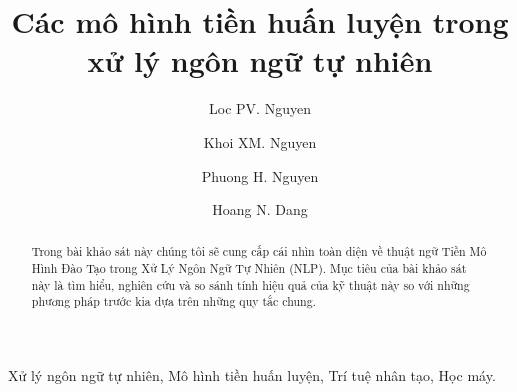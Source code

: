 \begin{frontmatter}
\title{Các mô hình tiền huấn luyện trong xử lý ngôn ngữ tự nhiên}
\author{Loc PV. Nguyen}
\author{Khoi XM. Nguyen}
\author{Phuong H. Nguyen}
\author{Hoang N. Dang}
\address{Faculty of Information Technology, FPT University Global Education, Ho Chi Minh city, Vietnam}

\begin{abstract}
Trong bài khảo sát này chúng tôi sẽ cung cấp cái nhìn toàn diện về thuật ngữ Tiền Mô Hình Đào Tạo trong Xử Lý Ngôn Ngữ Tự Nhiên (NLP). Mục tiêu của bài khảo sát này là tìm hiểu, nghiên cứu và so sánh tính hiệu quả của kỹ thuật này so với những phương pháp trước kia dựa trên những quy tắc chung.
\end{abstract}
\begin{keyword}
Xử lý ngôn ngữ tự nhiên, Mô hình tiền huấn luyện, Trí tuệ nhân tạo, Học máy.
\end{keyword}

\end{frontmatter}

